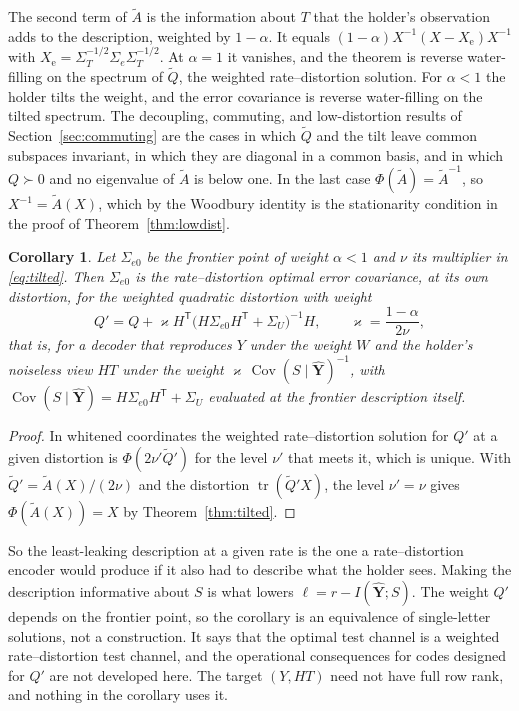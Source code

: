 \documentclass[11pt,onecolumn]{IEEEtran}
\newtheorem{corollary}[theorem]{Corollary}
\newcommand{\tr}{\operatorname{tr}}
\newcommand{\Cov}{\operatorname{Cov}}
\newcommand{\hY}{\hat{\mathbf Y}}
\newcommand{\Se}{\Sigma_{e}}
\newcommand{\Sez}{\Sigma_{e0}}
\begin{document}
The second term of $\tilde A$ is the information about $T$ that the
holder's observation adds to the description, weighted by $1-\alpha$. It
equals $(1-\alpha)X^{-1}(X-X_{\mathrm e})X^{-1}$ with
$X_{\mathrm e}=\Sigma_T^{-1/2}\Se\Sigma_T^{-1/2}$. At $\alpha=1$ it vanishes,
and the theorem is reverse water-filling on the spectrum of $\tilde Q$,
the weighted rate--distortion solution. For $\alpha<1$ the holder tilts
the weight, and the error covariance is reverse water-filling on the
tilted spectrum. The decoupling, commuting, and low-distortion results
of Section~\ref{sec:commuting} are the cases in which $\tilde Q$ and the
tilt leave common subspaces invariant, in which they are diagonal in a
common basis, and in which $Q\succ0$ and no eigenvalue of $\tilde A$ is
below one. In the last case $\Phi(\tilde A)=\tilde A^{-1}$, so
$X^{-1}=\tilde A(X)$, which by the Woodbury identity is the stationarity
condition in the proof of Theorem~\ref{thm:lowdist}.

\begin{corollary}\label{cor:augmented}
Let $\Sez$ be the frontier point of weight $\alpha<1$ and $\nu$ its
multiplier in \eqref{eq:tilted}. Then $\Sez$ is the rate--distortion
optimal error covariance, at its own distortion, for the weighted
quadratic distortion with weight
\[
Q'=Q+\varkappa H^{\mathsf T}\bigl(H\Sez H^{\mathsf T}+\Sigma_U\bigr)^{-1}H,
\qquad \varkappa=\frac{1-\alpha}{2\nu},
\]
that is, for a decoder that reproduces $Y$ under the weight $W$ and the
holder's noiseless view $HT$ under the weight
$\varkappa\,\Cov(S\mid\hY)^{-1}$, with $\Cov(S\mid\hY)=H\Sez H^{\mathsf T}+\Sigma_U$
evaluated at the frontier description itself.
\end{corollary}

\begin{proof}
In whitened coordinates the weighted rate--distortion solution for $Q'$
at a given distortion is $\Phi(2\nu'\tilde Q')$ for the level $\nu'$ that
meets it, which is unique. With $\tilde Q'=\tilde A(X)/(2\nu)$ and the
distortion $\tr(\tilde Q'X)$, the level $\nu'=\nu$ gives
$\Phi(\tilde A(X))=X$ by Theorem~\ref{thm:tilted}.
\end{proof}

So the least-leaking description at a given rate is the one a
rate--distortion encoder would produce if it also had to describe what
the holder sees. Making the description informative about $S$ is what
lowers $\ell=r-I(\hY;S)$. The weight $Q'$ depends on the frontier
point, so the corollary is an equivalence of single-letter solutions,
not a construction. It says that the optimal test channel is a weighted
rate--distortion test channel, and the operational consequences for
codes designed for $Q'$ are not developed here. The target $(Y,HT)$ need
not have full row rank, and nothing in the corollary uses it.
\end{document}
